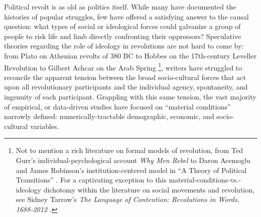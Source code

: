 Political revolt is as old as politics itself. While many have documented the histories of popular struggles, few have offered a satisfying answer to the causal question: what types of social or ideological forces could galvanize a group of people to risk life and limb directly confronting their oppressors? Speculative theories regarding the role of ideology in revolutions are not hard to come by: from Plato on Athenian revolts of 380 BC \citep{plato_republic_2007} to Hobbes on the 17th-century Leveller Revolution \citep{hobbes_leviathan_1994} to Gilbert Achcar on the Arab Spring \citep{achcar_morbid_2016}\footnote{Not to mention a rich literature on formal models of revolution, from Ted Gurr's individual-psychological account \textit{Why Men Rebel} \citep{gurr_why_1970} to Daron Acemoglu and James Robinson's institution-centered model in ``A Theory of Political Transitions'' \citep{acemoglu_theory_2001}. For a captivating exception to this material-conditions-vs.-ideology dichotomy within the literature on social movements and revolution, see Sidney Tarrow's \textit{The Language of Contention: Revolutions in Words, 1688-2012} \citep{tarrow_language_2013}.}, writers have struggled to reconcile the apparent tension between the broad socio-cultural forces that act upon all revolutionary participants and the individual agency, spontaneity, and ingenuity of each participant. Grappling with this same tension, the vast majority of empirical, or data-driven studies have focused on ``material conditions'' narrowly defined: numerically-tractable demographic, economic, and socio-cultural variables. 


